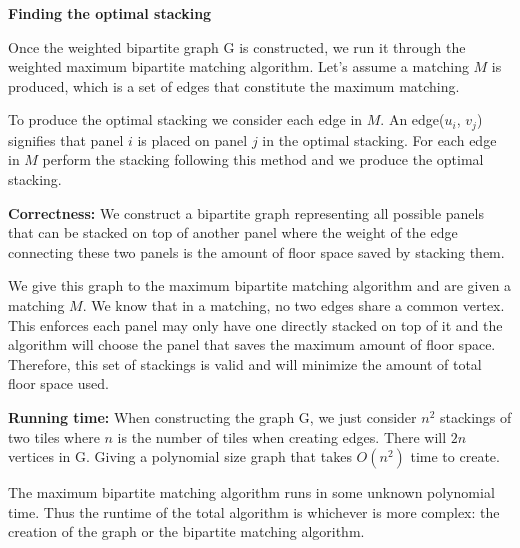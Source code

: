 \documentclass[11pt]{article}
\newcommand\correctness{\vspace{.10in}\textbf{Correctness: }}
\newcommand\runtime{\vspace{.10in}\textbf{Running time: }}
\begin{document}
\textbf{Finding the optimal stacking}

Once the weighted bipartite graph G is constructed, we run it through the weighted maximum bipartite matching algorithm. Let's assume a matching $M$ is produced, which is a set of edges that constitute the maximum matching.

To produce the optimal stacking we consider each edge in $M$. An edge($u_i$, $v_j$) signifies that panel $i$ is placed on panel $j$ in the optimal stacking. For each edge in $M$ perform the stacking following this method and we produce the optimal stacking.

\correctness We construct a bipartite graph representing all possible panels that can be stacked on top of another panel where the weight of the edge connecting these two panels is the amount of floor space saved by stacking them.

We give this graph to the maximum bipartite matching algorithm and are given a matching $M$. We know that in a matching, no two edges share a common vertex. This enforces each panel may only have one directly stacked on top of it and the algorithm will choose the panel that saves the maximum amount of floor space. Therefore, this set of stackings is valid and will minimize the amount of total floor space used.

\runtime When constructing the graph G, we just consider $n^2$ stackings of two tiles where $n$ is the number of tiles when creating edges. There will $2n$ vertices in G. Giving a polynomial size graph that takes $O(n^2)$ time to create.

	The maximum bipartite matching algorithm runs in some unknown polynomial time. Thus the runtime of the total algorithm is whichever is more complex: the creation of the graph or the bipartite matching algorithm.
\end{document}
